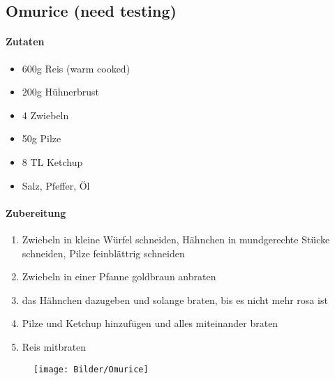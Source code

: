 \newpage
\subsection{Omurice (need testing)}
\paragraph{Zutaten}
\begin{itemize}[noitemsep]
	\item 600g Reis (warm cooked)
	\item 200g Hühnerbrust
	\item 4 Zwiebeln
	\item 50g Pilze
	\item 8 TL Ketchup
	\item Salz, Pfeffer, Öl
\end{itemize}
\paragraph{Zubereitung}
\begin{enumerate}[noitemsep]
	\item Zwiebeln in kleine Würfel schneiden, Hähnchen in mundgerechte Stücke schneiden, Pilze feinblättrig schneiden
	\item Zwiebeln in einer Pfanne goldbraun anbraten
	\item das Hähnchen dazugeben und solange braten, bis es nicht mehr rosa ist
	\item Pilze und Ketchup hinzufügen und alles miteinander braten
	\item Reis mitbraten
\end{enumerate}
\vspace{1.5cm}
\begin{figure}[h]
\centering
\texttt{[image: Bilder/Omurice]}
\end{figure}